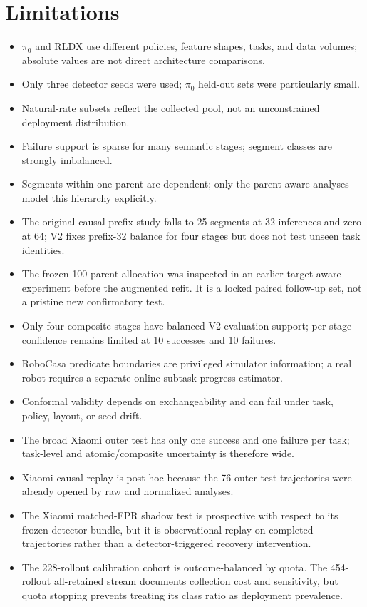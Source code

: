 \documentclass[11pt,a4paper]{article}
\begin{document}
\section{Limitations}
\begin{itemize}
\item $\pi_0$ and RLDX use different policies, feature shapes, tasks, and data volumes; absolute values are not direct architecture comparisons.
\item Only three detector seeds were used; $\pi_0$ held-out sets were particularly small.
\item Natural-rate subsets reflect the collected pool, not an unconstrained deployment distribution.
\item Failure support is sparse for many semantic stages; segment classes are strongly imbalanced.
\item Segments within one parent are dependent; only the parent-aware analyses model this hierarchy explicitly.
\item The original causal-prefix study falls to 25 segments at 32 inferences and zero at 64; V2 fixes prefix-32 balance for four stages but does not test unseen task identities.
\item The frozen 100-parent allocation was inspected in an earlier target-aware experiment before the augmented refit. It is a locked paired follow-up set, not a pristine new confirmatory test.
\item Only four composite stages have balanced V2 evaluation support; per-stage confidence remains limited at 10 successes and 10 failures.
\item RoboCasa predicate boundaries are privileged simulator information; a real robot requires a separate online subtask-progress estimator.
\item Conformal validity depends on exchangeability and can fail under task, policy, layout, or seed drift.
\item The broad Xiaomi outer test has only one success and one failure per task; task-level and atomic/composite uncertainty is therefore wide.
\item Xiaomi causal replay is post-hoc because the 76 outer-test trajectories were already opened by raw and normalized analyses.
\item The Xiaomi matched-FPR shadow test is prospective with respect to its
frozen detector bundle, but it is observational replay on completed
trajectories rather than a detector-triggered recovery intervention.
\item The 228-rollout calibration cohort is outcome-balanced by quota. The 454-rollout all-retained stream documents collection cost and sensitivity, but quota stopping prevents treating its class ratio as deployment prevalence.

\end{itemize}
\end{document}
